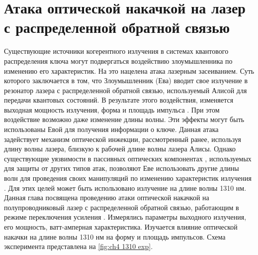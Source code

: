 \section{Атака оптической накачкой на лазер с распределенной обратной связью}\label{sec:ch4/sec1}
Существующие источники когерентного излучения в системах квантового распределения ключа могут подвергаться воздействию злоумышленника по изменению его характеристик. На это нацелена атака лазерным засеиванием. Суть которого заключается в том, что Злоумышленник (Ева) вводит свое излучение в резонатор лазера с распределенной обратной связью, используемый Алисой для передачи квантовых состояний. В результате этого воздействия, изменяется выходная мощность излучения, форма и площадь импульса \cite{huang2019, pang2020}. При этом воздействие возможно даже изменение длины волны. Эти эффекты могут быть использованы Евой для получения информации о ключе.
Данная атака задействует механизм оптической инжекции, рассмотренный ранее, используя длину волны лазера, близкую к рабочей длине волны лазера Алисы.
\newline Однако существующие уязвимости в пассивных оптических компонентах \cite{nasedkin2022, nasedkin2023,borisova2020}, используемых для защиты от других типов атак, позволяют Еве использовать другие длины волн для проведения своих манипуляций по изменению характеристик излучения \cite{lovic2023}. Для этих целей может быть использовано излучение на длине волны 1310 нм. Данная глава посвящена проведению атаки оптической накачкой \cite{svelto1998, okamoto2003,klinkhammer2012, guina2017} на полупроводниковый лазер с распределенной обратной связью, работающим в режиме переключения усиления \cite{svelto2010}. Измерялись параметры выходного излучения, его мощность, ватт-амперная характеристика. Изучается влияние оптической накачки на длине волны 1310 нм на форму и площадь импульсов. 
Схема эксперимента представлена на \ref{fig:ch4 1310 exp}.
